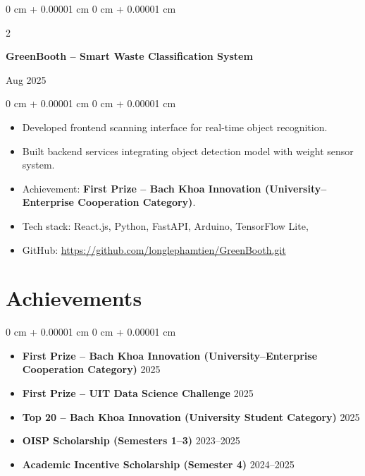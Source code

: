 \documentclass[10pt, letterpaper]{article}
\newenvironment{highlights}{
    \begin{itemize}[
        topsep=0.10 cm,
        parsep=0.10 cm,
        partopsep=0pt,
        itemsep=0pt,
        leftmargin=0 cm + 10pt
    ]
}
{
    \end{itemize}
}
\newenvironment{onecolentry}{
    \begin{adjustwidth}{
        0 cm + 0.00001 cm
    }{
        0 cm + 0.00001 cm
    }
}
{
    \end{adjustwidth}
}
\newenvironment{twocolentry}[2][]{
    \onecolentry
    \def\secondColumn{#2}
    \setcolumnwidth{\fill, 4.5 cm}
    \begin{paracol}{2}
}
{
    \switchcolumn \raggedleft \secondColumn
    \end{paracol}
    \endonecolentry
}
\begin{document}
\begin{twocolentry}{
    Aug 2025
}
    \textbf{GreenBooth – Smart Waste Classification System}
\end{twocolentry}

\vspace{0.10 cm}
\begin{onecolentry}
    \begin{highlights}
        \item Developed frontend scanning interface for real-time object recognition.
        \item Built backend services integrating object detection model with weight sensor system.
        \item Achievement: \textbf{First Prize – Bach Khoa Innovation (University–Enterprise Cooperation Category)}.
        \item Tech stack: React.js, Python, FastAPI, Arduino, TensorFlow Lite,
        \item GitHub: \href{https://github.com/longlephamtien/GreenBooth.git}{https://github.com/longlephamtien/GreenBooth.git}
    \end{highlights}
\end{onecolentry}
\vspace{0.1 cm}


        
\section{Achievements}

\begin{onecolentry}
\begin{highlights}
    \item \textbf{First Prize – Bach Khoa Innovation (University–Enterprise Cooperation Category)} \hfill 2025
    \item \textbf{First Prize – UIT Data Science Challenge} \hfill 2025
    \item \textbf{Top 20 – Bach Khoa Innovation (University Student Category)} \hfill 2025
    \item \textbf{OISP Scholarship (Semesters 1–3)} \hfill 2023--2025
    \item \textbf{Academic Incentive Scholarship (Semester 4)} \hfill 2024--2025
\end{highlights}
\end{onecolentry}
\end{document}
